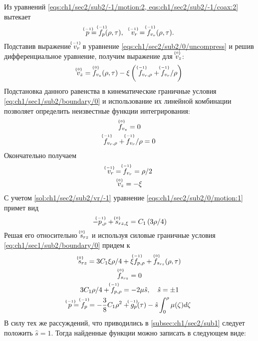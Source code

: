 Из уравнений \cref{eqs:ch1/sec2/sub2/-1/motion:2, eqs:ch1/sec2/sub2/-1/coax:2} вытекает
\begin{equation*}
  \uindex{p}{-1} = \uindex{f}{-1}_{p}(\rho, \tau), \quad \uindex{v}{-1}_{r} = \uindex{f}{-1}_{v_{r}}(\rho, \tau).
\end{equation*}
Подставив выражение $\uindex{v}{-1}_{r}$ в уравнение \cref{eqs:ch1/sec2/sub2/0/uncompress} и решив дифференциальное уравнение, получим выражение для $\uindex{v}{0}_{z}$:
\begin{equation*}
  \uindex{v}{0}_{z} = \uindex{f}{0}_{v_{z}}(\rho, \tau) -\xi \left(\ \uindex{f}{-1}_{v_{r},\rho} + \uindex{f}{-1}_{v_{r}} / \rho\right)
\end{equation*}
Подстановка данного равенства в кинематические граничные условия \cref{eq:ch1/sec1/sub2/boundary/0} и использование их линейной комбинации позволяет определить неизвестные функции интегрирования:
\begin{gather*}
  \uindex{f}{0}_{v_{z}} = 0
  \\
  \uindex{f}{-1}_{v_{r},\rho} + \uindex{f}{-1}_{v_{r}} / \rho = 0
\end{gather*}
Окончательно получаем
\begin{gather}
  \label{sol:ch1/sec2/sub2/vr/-1}
  \uindex{v}{-1}_{r} = \uindex{f}{-1}_{v_{r}} = \rho / 2
  \\
  \label{sol:ch1/sec2/sub2/vz/0}
  \uindex{v}{0}_{z} =  -\xi
\end{gather}
С учетом \cref{sol:ch1/sec2/sub2/vr/-1} уравнение \cref{eqs:ch1/sec2/sub2/0/motion:1} примет вид
\begin{equation*}
  -\uindex{p}{-1}_{,\rho}+\uindex{s}{0}_{rz,\xi} = C_1 \left(3 \rho / 4\right)
\end{equation*}
Решая его относительно $\uindex{s}{0}_{rz}$ и используя силовые граничные условия \cref{eq:ch1/sec1/sub2/boundary/0} придем к
\begin{gather*}
  \uindex{s}{0}_{rz} = 3 C_1 \xi \rho / 4 + \xi \uindex{f}{-1}_{p,\rho} + \uindex{f}{0}_{s_{rz}}(\rho, \tau)
  \\
  \uindex{f}{0}_{s_{rz}} = 0
  \\
  3 C_1 \rho / 4 + \uindex{f}{-1}_{p,\rho} = -2 \mu \hat{s}, \quad \hat{s} = \pm 1
  \\
  \uindex{p}{-1} = \uindex{f}{-1}_{p} = - \frac{3}{8}C_1\rho^2 + \uindex{g}{-1}_{p}(\tau) - \hat{s} \int_0^\rho \mu(\zeta)d\zeta
\end{gather*}
В силу тех же рассуждений, что приводились в \ref{subsec:ch1/sec2/sub1} следует положить $\hat{s} = 1$. Тогда найденные функции можно записать в следующем виде:
